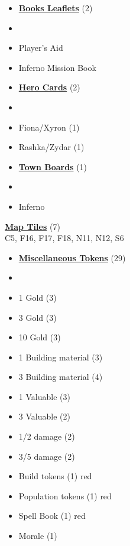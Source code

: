 
\begin{multicols*}{3}

\footnotesize

\begin{itemize}[leftmargin=0pt, label={}, noitemsep]
  \item \textbf{\small{\underline{Books Leaflets}}} (2)
  \item
  \item Player's Aid
  \item Inferno Mission Book
\end{itemize}

\begin{itemize}[leftmargin=0pt, label={}, noitemsep]
  \item \textbf{\small{\underline{Hero Cards}}} (2)
  \item
  \item Fiona/Xyron (1)
  \item Rashka/Zydar (1)
\end{itemize}

\begin{itemize}[leftmargin=0pt, label={}, noitemsep]
  \item \textbf{\small{\underline{Town Boards}}} (1)
  \item
  \item Inferno
\end{itemize}

\textbf{\small{\underline{Map Tiles}}} (7)\\

C5, F16, F17, F18, N11, N12, S6

\begin{itemize}[leftmargin=0pt, label={}, noitemsep]
  \item \textbf{\small{\underline{Miscellaneous Tokens}}} (29)
  \item
  \item 1 Gold (3)
  \item 3 Gold (3)
  \item 10 Gold (3)
  \item 1 Building material (3)
  \item 3 Building material (4)
  \item 1 Valuable (3)
  \item 3 Valuable (2)
  \item 1/2 damage (2)
  \item 3/5 damage (2)
  \item Build tokens (1) {red}
  \item Population tokens (1) {red}
  \item Spell Book (1) {red}
  \item Morale (1)
\end{itemize}


\end{multicols*}
